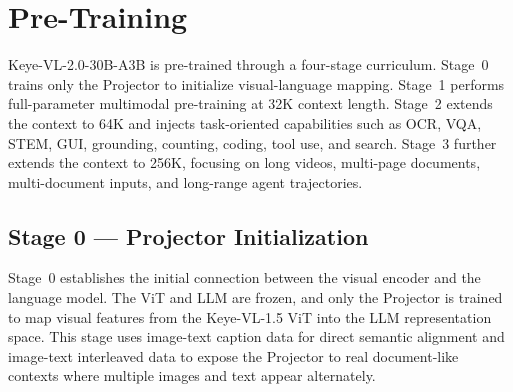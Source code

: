 \documentclass{article} %
\begin{document}
\section{Pre-Training}


Keye-VL-2.0-30B-A3B is pre-trained through a four-stage curriculum. Stage~0 trains only the Projector to initialize visual-language mapping. Stage~1 performs full-parameter multimodal pre-training at 32K context length. Stage~2 extends the context to 64K and injects task-oriented capabilities such as OCR, VQA, STEM, GUI, grounding, counting, coding, tool use, and search. Stage~3 further extends the context to 256K, focusing on long videos, multi-page documents, multi-document inputs, and long-range agent trajectories.



\subsection{Stage 0 --- Projector Initialization}
\label{stage_0}

Stage~0 establishes the initial connection between the visual encoder and the language model. The ViT and LLM are frozen, and only the Projector is trained to map visual features from the Keye-VL-1.5 ViT into the LLM representation space. This stage uses image-text caption data for direct semantic alignment and image-text interleaved data to expose the Projector to real document-like contexts where multiple images and text appear alternately.
\end{document}
